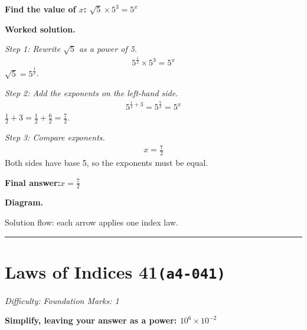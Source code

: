 \documentclass[11pt]{article}
\newcommand{\question}[1]{\par\medskip\noindent\textbf{#1}\par}
\begin{document}
\question{Find the value of \( x \): \( \sqrt{5} \times 5^3 = 5^x \)}

\textbf{Worked solution.}

\textit{Step 1: Rewrite \( \sqrt{5} \) as a power of 5.}
\[\begin{gathered}
5^{\frac{1}{2}} \times 5^3 = 5^x
\end{gathered}\]
\( \sqrt{5} = 5^{\frac{1}{2}} \).

\textit{Step 2: Add the exponents on the left-hand side.}
\[\begin{gathered}
5^{\frac{1}{2}+3} = 5^{\frac{7}{2}} = 5^x
\end{gathered}\]
\( \frac{1}{2} + 3 = \frac{1}{2} + \frac{6}{2} = \frac{7}{2} \).

\textit{Step 3: Compare exponents.}
\[\begin{gathered}
x = \frac{7}{2}
\end{gathered}\]
Both sides have base 5, so the exponents must be equal.

\begin{answerbox}
\textbf{Final answer:}\quad \(\displaystyle x = \frac{7}{2}\)
\end{answerbox}
\textbf{Diagram.}

\begin{center}
\end{center}
\small Solution flow: each arrow applies one index law.\normalsize

\medskip\hrule

\section*{Laws of Indices 41\quad\small\texttt{(a4-041)}}
\textit{Difficulty: Foundation \quad\textbar\quad Marks: 1}

\question{Simplify, leaving your answer as a power: \( 10^6 \times 10^{-2} \)}
\end{document}
